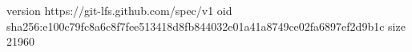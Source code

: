 version https://git-lfs.github.com/spec/v1
oid sha256:e100c79fc8a6c8f7fee513418d8fb844032e01a41a8749ce02fa6897ef2d9b1c
size 21960
